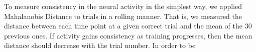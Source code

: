 To measure consistency in the neural activity in the simplest way, we applied Mahalanobis Distance to trials in a rolling manner. That is, we measured the distance between each time point at a given correct trial and the mean of the 30 previous ones. If activity gains consistency as training progresses, then the mean distance should decrease with the trial number. In order to be 